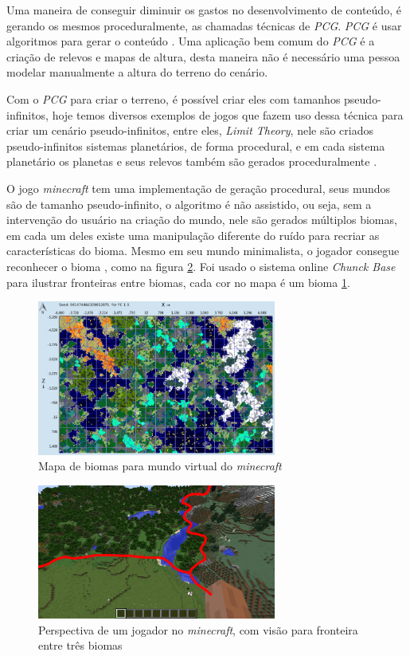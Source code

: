 Uma maneira de conseguir diminuir os gastos no desenvolvimento de conteúdo, é 
gerando os mesmos proceduralmente, as chamadas técnicas de \textit{PCG}. 
\textit{PCG} é usar algoritmos para gerar o conteúdo \cite{shaker2016procedural}.
Uma aplicação bem comum do \textit{PCG} é a criação de relevos e mapas de altura,
desta maneira não é necessário uma pessoa modelar manualmente a altura do
terreno do cenário.

Com o \textit{PCG} para criar o terreno, é possível criar eles com tamanhos
pseudo-infinitos, hoje temos diversos exemplos de jogos que fazem uso dessa técnica
para criar um cenário pseudo-infinitos, entre eles, \textit{Limit Theory}, nele
são criados pseudo-infinitos sistemas planetários, de forma procedural, e em cada
sistema planetário os planetas e seus relevos também são gerados proceduralmente
\cite{abreu1990toward}.

O jogo \textit{minecraft} tem uma implementação de geração procedural,
seus mundos são de tamanho pseudo-infinito, 
o algoritmo é não assistido, ou seja, sem a intervenção
do usuário na criação do mundo, nele
são gerados múltiplos biomas, em cada um deles existe uma manipulação diferente
do ruído para recriar as características do bioma. Mesmo em seu mundo
minimalista, o jogador consegue reconhecer o bioma \cite{short2012teaching},
como na figura \ref{fig:biomesminecraftgameplay}.
Foi usado o sistema online \textit{Chunck Base} para 
ilustrar fronteiras entre biomas, cada cor no mapa é um bioma \ref{fig:chunkbasebiomes}.


\begin{figure}[H]
    \centering
    \includegraphics[width=0.7\textwidth]{figuras/chunkbasebiomes.png}
    \caption{Mapa de biomas para mundo virtual do \textit{minecraft}}
    \label{fig:chunkbasebiomes}
\end{figure}

\begin{figure}[H]
    \centering
    \includegraphics[width=0.7\textwidth]{figuras/biomesminecraftgameplay.png}
    \caption{Perspectiva de um jogador no \textit{minecraft}, com visão para fronteira entre três biomas}
    \label{fig:biomesminecraftgameplay}
\end{figure}
